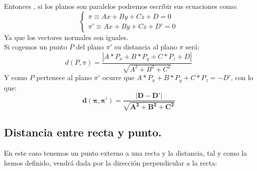 \documentclass[a4paper,11pt,answers]{exam}
\begin{document}
Entonces , si los planos son paralelos podremos escribir sus ecuaciones como:
\[\left\lbrace\begin{array}{l}
\pi \equiv Ax+By+Cz+D=0\\
\pi' \equiv Ax+By+Cz+D'=0
\end{array} \right.\]
Ya que los vectores normales son iguales.\\

Si cogemos un punto $P$ del plano $\pi'$ su distancia al plano $\pi$ será:
\[d(P,\pi) = \frac{|A*P_x + B*P_y+ C*P_z + D|}{\sqrt{A^2 + B^2 + C^2}}\]
Y como $P$ pertenece al plano $\pi'$ ocurre que $A*P_x + B*P_y+ C*P_z = -D'$, con lo que:
\[\boldsymbol{d(\pi,\pi') = \frac{|D - D'|}{\sqrt{A^2 + B^2 + C^2}}}\]
\subsection{Distancia entre recta y punto.}
En este caso tenemos un punto externo a una recta y la distancia, tal y como la hemos definido, vendrá dada por la dirección perpendicular a la recta:
\begin{center}
\end{center}
\end{document}
